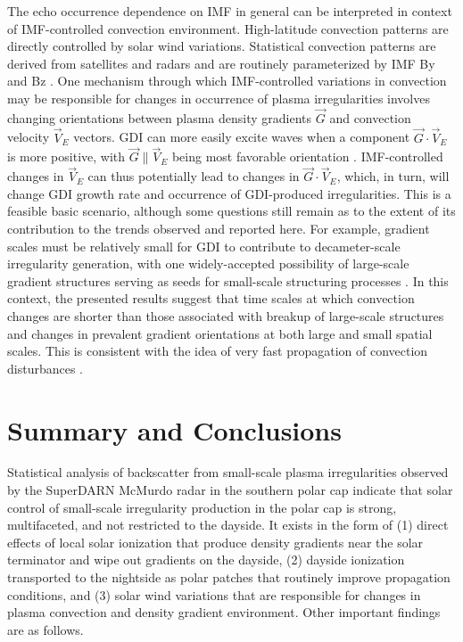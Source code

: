 The echo occurrence dependence on IMF in general can be interpreted in context of IMF-controlled convection environment. High-latitude convection patterns are directly controlled by solar wind variations. Statistical convection patterns are derived from satellites and radars and are routinely parameterized by IMF By and Bz \citep{Haaland2007, Pettigrew2010}. One mechanism through which IMF-controlled variations in convection may be responsible for changes in occurrence of plasma irregularities involves changing orientations between plasma density gradients \(\vec{G}\) and convection velocity \(\vec{V}_E\) vectors. GDI can more easily excite waves when a component \(\vec{G}\cdot\vec{V}_E\) is more positive, with \(\vec{G}\parallel\vec{V}_E\) being most favorable orientation \citep{Keskinen1982a,Makarevich2014c}. IMF-controlled changes in \(\vec{V}_E\) can thus potentially lead to changes in \(\vec{G}\cdot\vec{V}_E\), which, in turn, will change GDI growth rate and occurrence of GDI-produced irregularities. This is a feasible basic scenario, although some questions still remain as to the extent of its contribution to the trends observed and reported here. For example, gradient scales must be relatively small for GDI to contribute to decameter-scale irregularity generation, with one widely-accepted possibility of large-scale gradient structures serving as seeds for small-scale structuring processes \citep{Tsunoda1988}. In this context, the presented results suggest that time scales at which convection changes are shorter than those associated with breakup of large-scale structures and changes in prevalent gradient orientations at both large and small spatial scales. This is consistent with the idea of very fast propagation of convection disturbances \citep{Ridley1998,Ruohoniemi2002,Fiori2012,Taguchi2015}.


\section{Summary and Conclusions}

Statistical analysis of backscatter from small-scale plasma irregularities observed by the SuperDARN McMurdo radar in the southern polar cap indicate that solar control of small-scale irregularity production in the polar cap is strong, multifaceted, and not restricted to the dayside. It exists in the form of (1) direct effects of local solar ionization that produce density gradients near the solar terminator and wipe out gradients on the dayside, (2) dayside ionization transported to the nightside as polar patches that routinely improve propagation conditions, and (3) solar wind variations that are responsible for changes in plasma convection and density gradient environment. Other important findings are as follows.


